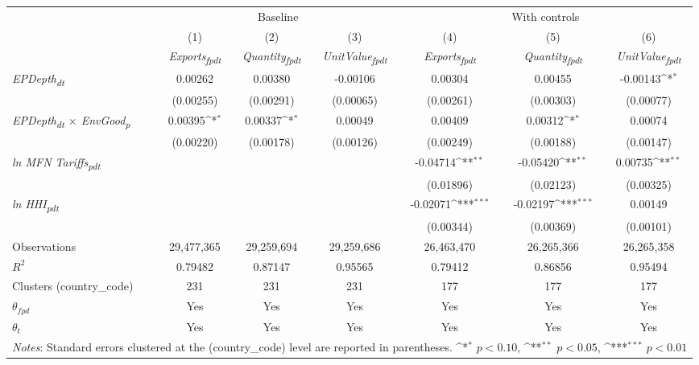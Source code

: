 {
\def\sym#1{\ifmmode^{#1}\else\(^{#1}\)\fi}
\begin{tabular}{l*{6}{c}}
\toprule
&\multicolumn{3}{c}{Baseline}&\multicolumn{3}{c}{With controls}\\\cmidrule(lr){2-4}\cmidrule(lr){5-7}
&(1)&(2)&(3)&(4)&(5)&(6)\\
&\textit{Exports\textsubscript{fpdt}}&\textit{Quantity\textsubscript{fpdt}}&\textit{UnitValue\textsubscript{fpdt}}&\textit{Exports\textsubscript{fpdt}}&\textit{Quantity\textsubscript{fpdt}}&\textit{UnitValue\textsubscript{fpdt}}\\
\midrule
\textit{EPDepth\textsubscript{dt}} & 0.00262 & 0.00380 & -0.00106 & 0.00304 & 0.00455 & -0.00143\sym{*}\\
 & (0.00255) & (0.00291) & (0.00065) & (0.00261) & (0.00303) & (0.00077)\\
\addlinespace
\textit{EPDepth\textsubscript{dt} $\times$ EnvGood\textsubscript{p}} & 0.00395\sym{*} & 0.00337\sym{*} & 0.00049 & 0.00409 & 0.00312\sym{*} & 0.00074\\
 & (0.00220) & (0.00178) & (0.00126) & (0.00249) & (0.00188) & (0.00147)\\
\addlinespace
\textit{ln MFN Tariffs\textsubscript{pdt}} &  &  &  & -0.04714\sym{**} & -0.05420\sym{**} & 0.00735\sym{**}\\
 &  &  &  & (0.01896) & (0.02123) & (0.00325)\\
\addlinespace
\textit{ln HHI\textsubscript{pdt}} &  &  &  & -0.02071\sym{***} & -0.02197\sym{***} & 0.00149\\
 &  &  &  & (0.00344) & (0.00369) & (0.00101)\\
\midrule
Observations & 29,477,365 & 29,259,694 & 29,259,686 & 26,463,470 & 26,265,366 & 26,265,358\\
$R^{2}$ & 0.79482 & 0.87147 & 0.95565 & 0.79412 & 0.86856 & 0.95494\\
Clusters (country_code) & 231 & 231 & 231 & 177 & 177 & 177\\
$\theta_{fpd}$ & Yes & Yes & Yes & Yes & Yes & Yes\\
$\theta_{t}$ & Yes & Yes & Yes & Yes & Yes & Yes\\
\bottomrule
\multicolumn{7}{l}{\footnotesize \textit{Notes}: Standard errors clustered at the (country_code) level are reported in parentheses. \sym{*} \(p<0.10\), \sym{**} \(p<0.05\), \sym{***} \(p<0.01\)}\\
\end{tabular}
}
